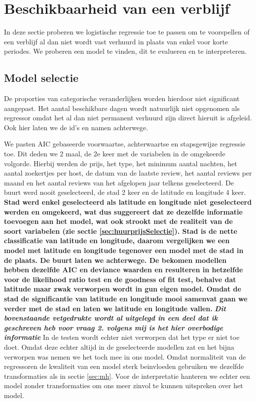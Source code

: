 \documentclass[a4paper,kulak]{kulakarticle} %
\begin{document}
\section{Beschikbaarheid van een verblijf}
In deze sectie proberen we logistische regressie toe te passen om te voorspellen of een verblijf al dan niet wordt vast verhuurd in plaats van enkel voor korte periodes.
We proberen een model te vinden, dit te evalueren en te interpreteren.
\subsection{Model selectie}
De proporties van categorische veranderlijken worden hierdoor niet significant aangepast.
Het aantal beschikbare dagen wordt natuurlijk niet opgenomen als regressor omdat het al dan niet permanent verhuurd zijn direct hieruit is afgeleid. Ook hier laten we de id's en namen achterwege.


We pasten AIC gebaseerde voorwaartse, achterwaartse en stapsgewijze regressie toe.
Dit deden we 2 maal, de 2e keer met de variabelen in de omgekeerde volgorde.
Hierbij werden de prijs, het type, het minimum aantal nachten, het aantal zoekertjes per host, de datum van de laatste review, het aantal reviews per maand en het aantal reviews van het afgelopen jaar telkens geselecteerd.
De buurt werd nooit geselecteerd, de stad 2 keer en de latitude en longitude 4 keer. \textbf{Stad werd enkel geselecteerd als latitude en longitude niet geselecteerd werden en omgekeerd, wat dus suggereert dat ze dezelfde informatie toevoegen aan het model, wat ook strookt met de realiteit van de soort variabelen (zie sectie \ref{sec:huurprijsSelectie}).
Stad is de nette classificatie van latitude en longitude, daarom vergelijken we een model met latitude en longitude tegenover een model met de stad in de plaats.
De buurt laten we achterwege.
De bekomen modellen hebben dezelfde AIC en deviance waarden en resulteren in hetzelfde voor de likelihood ratio test en de goodness of fit test, behalve dat latitude maar zwak verworpen wordt in gun eigen model.
Omdat de stad de significantie van latitude en longitude mooi samenvat gaan we verder met de stad en laten we latitude en longitude vallen.} \textbf{\textit{Dit bovenstaande vetgedrukte wordt al uitgelegd in een deel dat ik geschreven heb voor vraag 2. volgens mij is het hier overbodige informatie}}
In de testen wordt echter niet verworpen dat het type er niet toe doet.
Omdat deze echter altijd in de geselecteerde modellen zat en het bijna verworpen was nemen we het toch mee in ons model.
Omdat normaliteit van de regressoren de kwaliteit van een model sterk beinvloeden gebruiken we dezelfde transformaties als in sectie \ref{sec:mh}.
Voor de interpretatie hanteren we echter een model zonder transformaties om ons meer zinvol te kunnen uitspreken over het model. 
\end{document}
